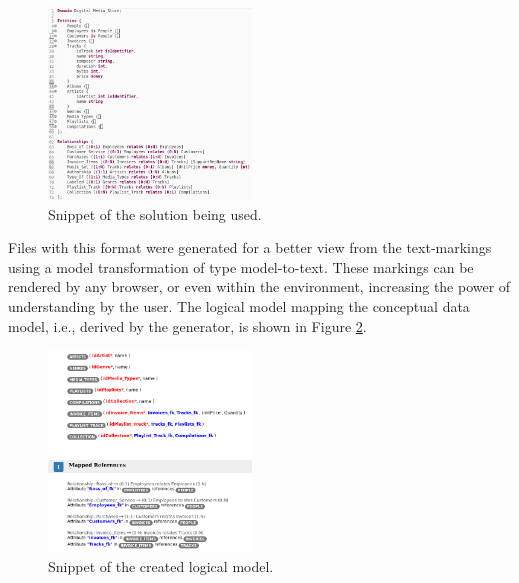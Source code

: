 \documentclass[a4paper,twoside,anonymous]{article}
\begin{document}
\begin{figure}[!htb]
    \centering
    \includegraphics[width=0.48\textwidth]{images/ERTextUso4.png}
    \caption{Snippet of the solution being used.}
    \label{fig:ERTextUso}
\end{figure}


Files with this format were generated for a better view from the text-markings using a model transformation of type model-to-text. 
These markings can be rendered by any browser, or even within the environment, increasing the power of understanding by the user.
The logical model mapping the conceptual data model, i.e., derived by the generator, is shown in Figure \ref{fig:modeloLogico}.


\begin{figure}[!htb]
    \centering
    \includegraphics[width=0.48\textwidth]{images/ModeloLogico3.png}
    \caption{Snippet of the created logical model.}
    \label{fig:modeloLogico}
\end{figure}
\end{document}
